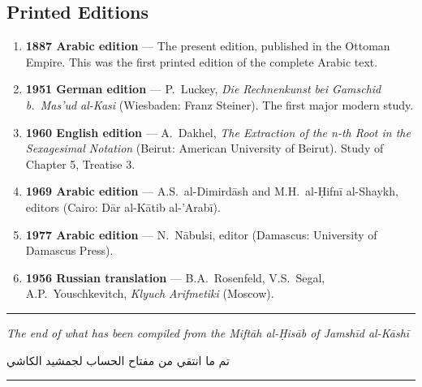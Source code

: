 \documentclass[11pt,a4paper]{article}
\newcommand{\shortline}{\noindent\rule{0.5\textwidth}{0.4pt}\par}
\newcommand{\ar}[1]{{\arabicfont\beginR #1\endR}}
\begin{document}
\subsection{Printed Editions}

\begin{enumerate}[label=\arabic*.]
  \item \textbf{1887 Arabic edition} --- The present edition, published in
  the Ottoman Empire. This was the first printed edition of the
  complete Arabic text.
  \item \textbf{1951 German edition} --- P.\ Luckey, \textit{Die
  Rechnenkunst bei Gamschid b.\ Mas'ud al-Kasi} (Wiesbaden: Franz
  Steiner). The first major modern study.
  \item \textbf{1960 English edition} --- A.\ Dakhel, \textit{The Extraction
  of the n-th Root in the Sexagesimal Notation} (Beirut: American
  University of Beirut). Study of Chapter 5, Treatise 3.
  \item \textbf{1969 Arabic edition} --- A.S.\ al-Dimird\=ash and
  M.H.\ al-\d{H}ifn\=i al-Shaykh, editors (Cairo: D\=ar al-K\=atib al-'Arab\=i).
  \item \textbf{1977 Arabic edition} --- N.\ N\=abulsi, editor (Damascus:
  University of Damascus Press).
  \item \textbf{1956 Russian translation} --- B.A.\ Rosenfeld, V.S.\ Segal,
  A.P.\ Youschkevitch, \textit{Klyuch Arifmetiki} (Moscow).
\end{enumerate}

\vspace{0.5cm}

\begin{center}
\shortline

\vspace{0.5cm}

\textit{The end of what has been compiled from the \textit{Mift\=ah
al-\d{H}is\=ab} of Jamsh\=id al-K\=ash\=i}

\vspace{0.3cm}

\ar{تم ما انتقي من مفتاح الحساب لجمشيد الكاشي}

\vspace{0.5cm}

\shortline
\end{center}
\end{document}
